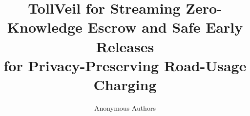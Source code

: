 \documentclass[letterpaper,twocolumn,10pt]{article}
\begin{document}
\title{TollVeil for Streaming Zero-Knowledge Escrow and Safe Early Releases\\for Privacy-Preserving Road-Usage Charging}
\author{{\rm Anonymous Authors}}
\maketitle

\begin{abstract}

\end{abstract}











\flushcolsend
\clearpage
\raggedcolsend


\clearpage
\appendix

\end{document}
